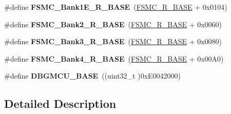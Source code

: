 \begin{DoxyCompactItemize}
\item 
\hypertarget{group___peripheral__memory__map_gaea182589c84aee30b7f735474d8774e2}{\#define {\bfseries F\-S\-M\-C\-\_\-\-Bank1\-E\-\_\-\-R\-\_\-\-B\-A\-S\-E}~(\hyperlink{group___peripheral__memory__map_gaddf0e199dccba83272b20c9fb4d3aaed}{F\-S\-M\-C\-\_\-\-R\-\_\-\-B\-A\-S\-E} + 0x0104)}\label{group___peripheral__memory__map_gaea182589c84aee30b7f735474d8774e2}

\item 
\hypertarget{group___peripheral__memory__map_ga3cb46d62f4f6458e186a5a4c753e4918}{\#define {\bfseries F\-S\-M\-C\-\_\-\-Bank2\-\_\-\-R\-\_\-\-B\-A\-S\-E}~(\hyperlink{group___peripheral__memory__map_gaddf0e199dccba83272b20c9fb4d3aaed}{F\-S\-M\-C\-\_\-\-R\-\_\-\-B\-A\-S\-E} + 0x0060)}\label{group___peripheral__memory__map_ga3cb46d62f4f6458e186a5a4c753e4918}

\item 
\hypertarget{group___peripheral__memory__map_gacf056152c9e5aefcc67db78d1302c0d7}{\#define {\bfseries F\-S\-M\-C\-\_\-\-Bank3\-\_\-\-R\-\_\-\-B\-A\-S\-E}~(\hyperlink{group___peripheral__memory__map_gaddf0e199dccba83272b20c9fb4d3aaed}{F\-S\-M\-C\-\_\-\-R\-\_\-\-B\-A\-S\-E} + 0x0080)}\label{group___peripheral__memory__map_gacf056152c9e5aefcc67db78d1302c0d7}

\item 
\hypertarget{group___peripheral__memory__map_gaf9e5417133160b0bdd0498d982acec19}{\#define {\bfseries F\-S\-M\-C\-\_\-\-Bank4\-\_\-\-R\-\_\-\-B\-A\-S\-E}~(\hyperlink{group___peripheral__memory__map_gaddf0e199dccba83272b20c9fb4d3aaed}{F\-S\-M\-C\-\_\-\-R\-\_\-\-B\-A\-S\-E} + 0x00\-A0)}\label{group___peripheral__memory__map_gaf9e5417133160b0bdd0498d982acec19}

\item 
\hypertarget{group___peripheral__memory__map_ga4adaf4fd82ccc3a538f1f27a70cdbbef}{\#define {\bfseries D\-B\-G\-M\-C\-U\-\_\-\-B\-A\-S\-E}~((uint32\-\_\-t )0x\-E0042000)}\label{group___peripheral__memory__map_ga4adaf4fd82ccc3a538f1f27a70cdbbef}

\end{DoxyCompactItemize}


\subsection{Detailed Description}


